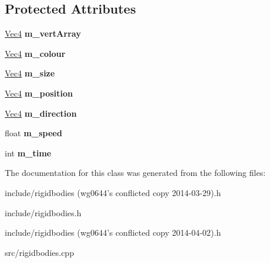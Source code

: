 \subsection*{Protected Attributes}
\begin{DoxyCompactItemize}
\item 
\hypertarget{classRigidBodies_afb1876cbe01ca3360b2b4a8242335362}{
\hyperlink{classVec4}{Vec4} {\bfseries m\_\-vertArray}}
\label{classRigidBodies_afb1876cbe01ca3360b2b4a8242335362}

\item 
\hypertarget{classRigidBodies_aa1d19a0a2f85b1c0f2a94116008baeed}{
\hyperlink{classVec4}{Vec4} {\bfseries m\_\-colour}}
\label{classRigidBodies_aa1d19a0a2f85b1c0f2a94116008baeed}

\item 
\hypertarget{classRigidBodies_aaec69d14601a2e9eab08eafe61321cf4}{
\hyperlink{classVec4}{Vec4} {\bfseries m\_\-size}}
\label{classRigidBodies_aaec69d14601a2e9eab08eafe61321cf4}

\item 
\hypertarget{classRigidBodies_a08fd8311a53f758751b89b2ec91f5b78}{
\hyperlink{classVec4}{Vec4} {\bfseries m\_\-position}}
\label{classRigidBodies_a08fd8311a53f758751b89b2ec91f5b78}

\item 
\hypertarget{classRigidBodies_a06e80a2ec34732648a2738e84c272bf3}{
\hyperlink{classVec4}{Vec4} {\bfseries m\_\-direction}}
\label{classRigidBodies_a06e80a2ec34732648a2738e84c272bf3}

\item 
\hypertarget{classRigidBodies_a0a0b1d2dacdfab3a902d1d4201d41949}{
float {\bfseries m\_\-speed}}
\label{classRigidBodies_a0a0b1d2dacdfab3a902d1d4201d41949}

\item 
\hypertarget{classRigidBodies_a674b5391936d268093427d656d5d4206}{
int {\bfseries m\_\-time}}
\label{classRigidBodies_a674b5391936d268093427d656d5d4206}

\end{DoxyCompactItemize}


The documentation for this class was generated from the following files:\begin{DoxyCompactItemize}
\item 
include/rigidbodies (wg0644's conflicted copy 2014-\/03-\/29).h\item 
include/rigidbodies.h\item 
include/rigidbodies (wg0644's conflicted copy 2014-\/04-\/02).h\item 
src/rigidbodies.cpp\end{DoxyCompactItemize}
